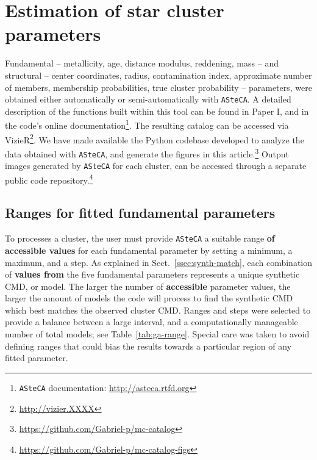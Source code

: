 \documentclass[referee]{aa}
\begin{document}

\section{Estimation of star cluster parameters}
\label{sec:fund-params}

Fundamental -- metallicity, age, distance modulus, reddening, mass -- and
structural -- center coordinates, radius, contamination index, approximate
number of members, membership probabilities, true cluster probability --
parameters, were obtained either automatically or semi-automatically with
\texttt{ASteCA}.
%
A detailed description of the functions built within this tool can be found in
Paper I, and in the code's online documentation\footnote{\texttt{ASteCA}
documentation: \url{http://asteca.rtfd.org}}.
%
The resulting catalog can be accessed via
VizieR\footnote{\url{http://vizier.XXXX}}.
We have made available the Python codebase developed to analyze
the data obtained with \texttt{ASteCA}, and generate the figures in this
article.\footnote{\url{https://github.com/Gabriel-p/mc-catalog}}
%
Output images generated by \texttt{ASteCA} for each cluster, can be
accessed through a separate public code
repository.\footnote{\url{https://github.com/Gabriel-p/mc-catalog-figs}}



\subsection{Ranges for fitted fundamental parameters}
\label{ssec:param-ranges}

To processes a cluster, the user must provide \texttt{ASteCA} a
suitable range \textbf{of accessible values} for each fundamental parameter by
setting a minimum, a maximum, and a step.
%
As explained in Sect.~\ref{ssec:synth-match}, each combination of \textbf{values
from} the five fundamental parameters represents a unique synthetic CMD, or
model.
%
%
The larger the number of \textbf{accessible} parameter values, the larger the
amount of models the code will process to find the synthetic CMD which best
matches the observed cluster CMD.\@
%
Ranges and steps were selected to provide a balance between a large interval,
and a computationally manageable number of total models;
see Table~\ref{tab:ga-range}. Special care was taken to avoid defining ranges
that could bias the results towards a particular region of any fitted
parameter.\\
\end{document}
